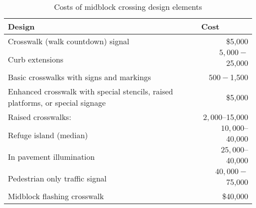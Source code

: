 \begin{table}[h]
\centering
\begin{tabular}{@{}lr@{}}
\toprule
Design                                                                         & \multicolumn{1}{l}{Cost} \\ \midrule
Crosswalk (walk countdown) signal                                              & \$5,000                  \\
Curb extensions                                                                & $5,000 - $25,000         \\
Basic crosswalks with signs and markings                                       & $500 - $1,500            \\
Enhanced crosswalk with special stencils, raised platforms, or special signage & \$5,000                  \\
Raised crosswalks:                                                             & $2,000 – $15,000         \\
Refuge island (median)                                                         & $10,000 – $40,000        \\
In pavement illumination                                                       & $25,000 – $40,000        \\
Pedestrian only traffic signal                                                 & $40,000 - $75,000        \\
Midblock flashing crosswalk                                                    & \$40,000                \\
\bottomrule
\end{tabular}
\caption{Costs of midblock crossing design elements}
\end{table}